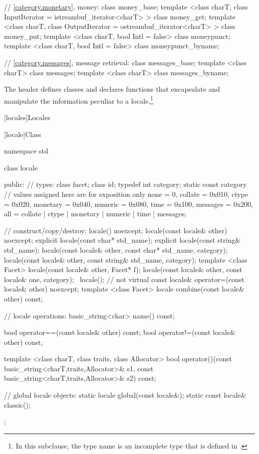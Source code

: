 \begin{codeblock}
{  // \ref{category.monetary}, money:
  class money_base;
  template <class charT, class InputIterator = istreambuf_iterator<charT> >  class money_get;
  template <class charT, class OutputIterator = ostreambuf_iterator<charT> > class money_put;
  template <class charT, bool Intl = false> class moneypunct;
  template <class charT, bool Intl = false> class moneypunct_byname;

  // \ref{category.messages}, message retrieval:
  class messages_base;
  template <class charT> class messages;
  template <class charT> class messages_byname;
}
\end{codeblock}

\pnum
The header
defines classes and declares functions that encapsulate and manipulate
the information peculiar to a locale.\footnote{In this subclause, the type name
is an incomplete type that is defined in
%
.}

[locales]{Locales}

[locale]{Class }

%
\begin{codeblock}
namespace std {
  class locale {
  public:
    // types:
    class facet;
    class id;
    typedef int category;
    static const category   // values assigned here are for exposition only
      none     = 0,
      collate  = 0x010, ctype    = 0x020,
      monetary = 0x040, numeric  = 0x080,
      time     = 0x100, messages = 0x200,
      all = collate | ctype | monetary | numeric | time  | messages;

    // construct/copy/destroy:
    locale() noexcept;
    locale(const locale& other) noexcept;
    explicit locale(const char* std_name);
    explicit locale(const string& std_name);
    locale(const locale& other, const char* std_name, category);
    locale(const locale& other, const string& std_name, category);
    template <class Facet> locale(const locale& other, Facet* f);
    locale(const locale& other, const locale& one, category);
    ~locale();                  // not virtual
    const locale& operator=(const locale& other) noexcept;
    template <class Facet> locale combine(const locale& other) const;

    // locale operations:
    basic_string<char>                  name() const;

    bool operator==(const locale& other) const;
    bool operator!=(const locale& other) const;

    template <class charT, class traits, class Allocator>
      bool operator()(const basic_string<charT,traits,Allocator>& s1,
                      const basic_string<charT,traits,Allocator>& s2) const;

    // global locale objects:
    static       locale  global(const locale&);
    static const locale& classic();
  };
}
\end{codeblock}

